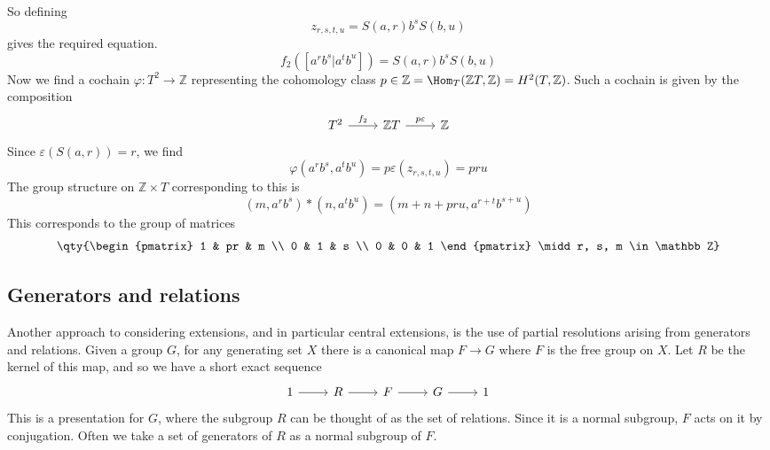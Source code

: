 \begin{example}
\begin{align*}
    \end{align*}
    So defining
    \[ z_{r,s,t,u} = S(a,r) b^s S(b,u) \]
    gives the required equation.
    \[ f_2([a^r b^s | a^t b^u]) = S(a,r) b^s S(b,u) \]
    Now we find a cochain \( \varphi : T^2 \to \mathbb Z \) representing the cohomology class \( p \in \mathbb Z = \Hom_T(\mathbb Z T, \mathbb Z) = H^2(T, \mathbb Z) \).
    Such a cochain is given by the composition
\[\begin{tikzcd}
	{T^2} & {\mathbb ZT} & {\mathbb Z}
	\arrow["{f_2}", from=1-1, to=1-2]
	\arrow["p\varepsilon", from=1-2, to=1-3]
\end{tikzcd}\]
    Since \( \varepsilon(S(a, r)) = r \), we find
    \[ \varphi(a^r b^s, a^t b^u) = p\varepsilon(z_{r,s,t,u}) = pru \]
    The group structure on \( \mathbb Z \times T \) corresponding to this is
    \[ (m, a^r b^s) \ast (n, a^t b^u) = (m + n + pru, a^{r+t} b^{s+u}) \]
    This corresponds to the group of matrices
    \[ \qty{\begin{pmatrix}
        1 & pr & m \\
        0 & 1 & s \\
        0 & 0 & 1
    \end{pmatrix} \midd r, s, m \in \mathbb Z} \]
\end{example}

\subsection{Generators and relations}
Another approach to considering extensions, and in particular central extensions, is the use of partial resolutions arising from generators and relations.
Given a group \( G \), for any generating set \( X \) there is a canonical map \( F \to G \) where \( F \) is the free group on \( X \).
Let \( R \) be the kernel of this map, and so we have a short exact sequence
\[\begin{tikzcd}
	1 & R & F & G & 1
	\arrow[from=1-1, to=1-2]
	\arrow[from=1-2, to=1-3]
	\arrow[from=1-3, to=1-4]
	\arrow[from=1-4, to=1-5]
\end{tikzcd}\]
This is a presentation for \( G \), where the subgroup \( R \) can be thought of as the set of relations.
Since it is a normal subgroup, \( F \) acts on it by conjugation.
Often we take a set of generators of \( R \) as a normal subgroup of \( F \).

